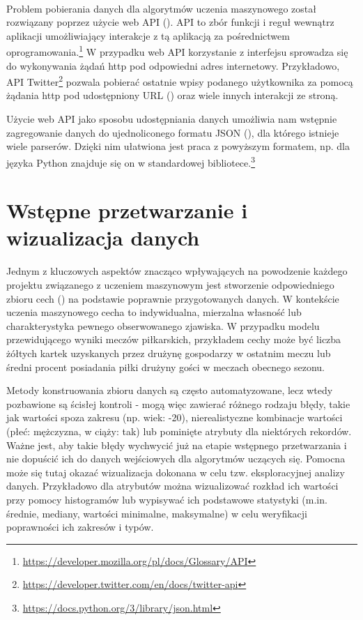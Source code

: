 ~

Problem pobierania danych dla algorytmów uczenia maszynowego został rozwiązany poprzez użycie web API (). API to zbór funkcji i reguł wewnątrz aplikacji umożliwiający interakcje z tą aplikacją za pośrednictwem oprogramowania.\footnote{\url{https://developer.mozilla.org/pl/docs/Glossary/API}} W przypadku web API korzystanie z interfejsu sprowadza się do wykonywania żądań http pod odpowiedni adres internetowy. Przykładowo, API Twitter\footnote{\url{https://developer.twitter.com/en/docs/twitter-api}} pozwala pobierać ostatnie wpisy podanego użytkownika za pomocą żądania http pod udostępniony URL () oraz wiele innych interakcji ze stroną.

Użycie web API jako sposobu udostępniania danych umożliwia nam wstępnie zagregowanie danych do ujednoliconego formatu JSON (), dla którego istnieje wiele parserów. Dzięki nim ułatwiona jest praca z powyższym formatem, np. dla języka Python znajduje się on w standardowej bibliotece.\footnote{\url{https://docs.python.org/3/library/json.html}}

\section{Wstępne przetwarzanie i wizualizacja danych}

\noindent 
Jednym z kluczowych aspektów znacząco wpływających na powodzenie każdego projektu związanego z uczeniem maszynowym jest stworzenie odpowiedniego zbioru cech () na podstawie poprawnie przygotowanych danych. W kontekście uczenia maszynowego cecha to indywidualna, mierzalna własność lub charakterystyka pewnego obserwowanego zjawiska. W przypadku modelu przewidującego wyniki meczów piłkarskich, przykładem cechy może być liczba żółtych kartek uzyskanych przez drużynę gospodarzy w ostatnim meczu lub średni procent posiadania piłki drużyny gości w meczach obecnego sezonu.

Metody konstruowania zbioru danych są często automatyzowane, lecz wtedy pozbawione są ścisłej kontroli - mogą więc zawierać różnego rodzaju błędy, takie jak wartości spoza zakresu (np. wiek: -20), nierealistyczne kombinacje wartości (płeć: mężczyzna, w ciąży: tak) lub pominięte atrybuty dla niektórych rekordów. Ważne jest, aby takie błędy wychwycić już na etapie wstępnego przetwarzania i nie dopuścić ich do danych wejściowych dla algorytmów uczących się. Pomocna może się tutaj okazać wizualizacja dokonana w celu tzw. eksploracyjnej analizy danych. Przykładowo dla atrybutów można wizualizować rozkład ich wartości przy pomocy histogramów lub wypisywać ich podstawowe statystyki (m.in. średnie, mediany, wartości minimalne, maksymalne) w celu weryfikacji poprawności ich zakresów i typów.

